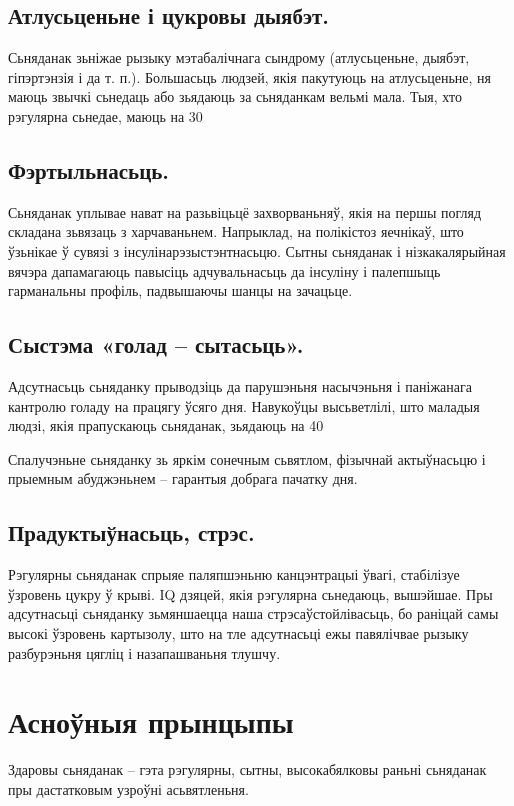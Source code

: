 \subsection{Атлусьценьне і цукровы дыябэт.}
Сьняданак зьніжае рызыку мэтабалічнага сындрому (атлусьценьне, дыябэт, гіпэртэнзія і да т. п.). Большасьць людзей, якія пакутуюць на атлусьценьне, ня маюць звычкі сьнедаць або зьядаюць за сьняданкам вельмі мала. Тыя, хто рэгулярна сьнедае, маюць на 30%

\subsection{Фэртыльнасьць.}
Сьняданак уплывае нават на разьвіцьцё захворваньняў, якія на першы погляд складана зьвязаць з харчаваньнем. Напрыклад, на полікістоз яечнікаў, што ўзьнікае ў сувязі з інсулінарэзыстэнтнасьцю. Сытны сьняданак і нізкакалярыйная вячэра дапамагаюць павысіць адчувальнасьць да інсуліну і палепшыць гарманальны профіль, падвышаючы шанцы на зачацьце.

\subsection{Сыстэма «голад – сытасьць».}
Адсутнасьць сьняданку прыводзіць да парушэньня насычэньня і паніжанага кантролю голаду на працягу ўсяго дня. Навукоўцы высьветлілі, што маладыя людзі, якія прапускаюць сьняданак, зьядаюць на 40%

Спалучэньне сьняданку зь яркім сонечным сьвятлом, фізычнай актыўнасьцю і прыемным абуджэньнем – гарантыя добрага пачатку дня.

\subsection{Прадуктыўнасьць, стрэс.}
Рэгулярны сьняданак спрыяе паляпшэньню канцэнтрацыі ўвагі, стабілізуе ўзровень цукру ў крыві. IQ дзяцей, якія рэгулярна сьнедаюць, вышэйшае. Пры адсутнасьці сьняданку зьмяншаецца наша стрэсаўстойлівасьць, бо раніцай самы высокі ўзровень картызолу, што на тле адсутнасьці ежы павялічвае рызыку разбурэньня цягліц і назапашваньня тлушчу.

\section{Асноўныя прынцыпы}

Здаровы сьняданак – гэта рэгулярны, сытны, высокабялковы раньні сьняданак пры дастатковым узроўні асьвятленьня.

